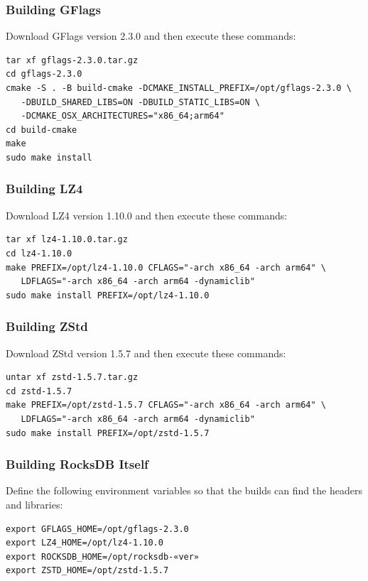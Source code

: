\subsubsection{Building GFlags}
\label{sec:BuildingGFlags}

Download GFlags version 2.3.0 and then execute these commands:

{\small\begin{verbatim}
tar xf gflags-2.3.0.tar.gz
cd gflags-2.3.0
cmake -S . -B build-cmake -DCMAKE_INSTALL_PREFIX=/opt/gflags-2.3.0 \
   -DBUILD_SHARED_LIBS=ON -DBUILD_STATIC_LIBS=ON \
   -DCMAKE_OSX_ARCHITECTURES="x86_64;arm64"
cd build-cmake
make
sudo make install
\end{verbatim}}

\subsubsection{Building LZ4}
\label{sec:BuildingLZ4}

Download LZ4 version 1.10.0 and then execute these commands:

{\small\begin{verbatim}
tar xf lz4-1.10.0.tar.gz
cd lz4-1.10.0
make PREFIX=/opt/lz4-1.10.0 CFLAGS="-arch x86_64 -arch arm64" \
   LDFLAGS="-arch x86_64 -arch arm64 -dynamiclib"
sudo make install PREFIX=/opt/lz4-1.10.0
\end{verbatim}}

\subsubsection{Building ZStd}
\label{sec:BuildingZStd}

Download ZStd version 1.5.7 and then execute these commands:

{\small\begin{verbatim}
untar xf zstd-1.5.7.tar.gz
cd zstd-1.5.7
make PREFIX=/opt/zstd-1.5.7 CFLAGS="-arch x86_64 -arch arm64" \
   LDFLAGS="-arch x86_64 -arch arm64 -dynamiclib"
sudo make install PREFIX=/opt/zstd-1.5.7
\end{verbatim}}

\subsubsection{Building RocksDB Itself}
\label{sec:BuildingRocksDBItself}

Define the following environment variables so that the builds can find the headers and libraries:
{\small\begin{verbatim}
export GFLAGS_HOME=/opt/gflags-2.3.0
export LZ4_HOME=/opt/lz4-1.10.0
export ROCKSDB_HOME=/opt/rocksdb-«ver»
export ZSTD_HOME=/opt/zstd-1.5.7
\end{verbatim}}

